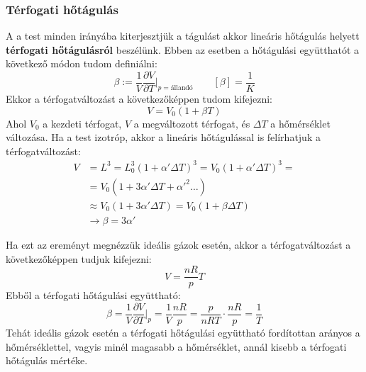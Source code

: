 \documentclass[a4paper,12pt]{article}
\begin{document}
\subsubsection*{Térfogati hőtágulás}
A a test minden irányába kiterjesztjük a tágulást akkor lineáris hőtágulás helyett \textbf{térfogati hőtágulásról} beszélünk. Ebben az esetben a hőtágulási együtthatót a következő módon tudom definiálni:
\begin{equation}
    \beta := \frac{1}{V} \frac{\partial V}{\partial T}\bigg|_{p=\text{állandó}} \quad \quad \left[\beta\right] = \frac{1}{K}
\end{equation}
Ekkor a térfogatváltozást a következőképpen tudom kifejezni:
\begin{equation}
    V = V_0 (1 + \beta T)
\end{equation}
Ahol $V_0$ a kezdeti térfogat, $V$ a megváltozott térfogat, és $\Delta T$ a hőmérséklet változása. Ha a test izotróp, akkor a lineáris hőtágulással is felírhatjuk a térfogatváltozást:
\begin{equation}
    \begin{aligned}
        V &= L^3 = L_0^3 (1 + \alpha' \Delta T)^3 = V_0 (1 + \alpha' \Delta T)^3 = \\
        &= V_0 (1 + 3\alpha' \Delta T + \alpha'^2 \dots)  \\
        &\approx V_0 (1 + 3\alpha' \Delta T) = V_0 (1 + \beta \Delta T) \\
        &\rightarrow \beta = 3 \alpha'
    \end{aligned}
\end{equation}

Ha ezt az ereményt megnézzük ideális gázok esetén, akkor a térfogatváltozást a következőképpen tudjuk kifejezni:
\begin{equation}
    V = \frac{nR}{p} T
\end{equation}
Ebből a térfogati hőtágulási együttható:
\begin{equation}
    \beta = \frac{1}{V} \frac{\partial V}{\partial T}\bigg|_{p} = \frac{1}{V} \frac{nR}{p} = \frac{p}{nRT} \cdot \frac{nR}{p} = \frac{1}{T}
\end{equation}
Tehát ideális gázok esetén a térfogati hőtágulási együttható fordítottan arányos a hőmérséklettel, vagyis minél magasabb a hőmérséklet, annál kisebb a térfogati hőtágulás mértéke.
\end{document}

